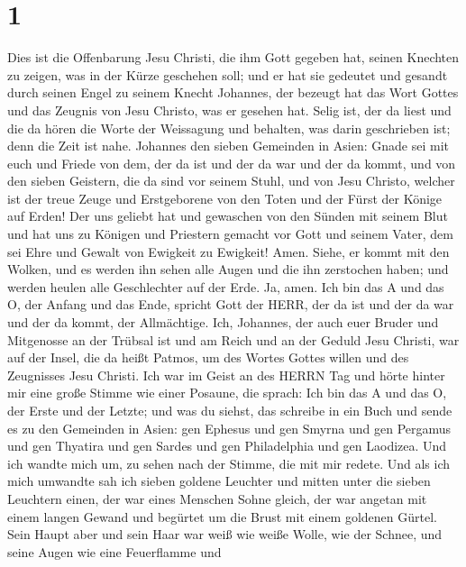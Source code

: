 \hypertarget{section}{%
\section{1}\label{section}}

 Dies ist die Offenbarung Jesu Christi, die ihm Gott gegeben
hat, seinen Knechten zu zeigen, was in der Kürze geschehen soll; und er
hat sie gedeutet und gesandt durch seinen Engel zu seinem Knecht
Johannes,  der bezeugt hat das Wort Gottes und das Zeugnis
von Jesu Christo, was er gesehen hat.  Selig ist, der da
liest und die da hören die Worte der Weissagung und behalten, was darin
geschrieben ist; denn die Zeit ist nahe.  Johannes den
sieben Gemeinden in Asien: Gnade sei mit euch und Friede von dem, der da
ist und der da war und der da kommt, und von den sieben Geistern, die da
sind vor seinem Stuhl,  und von Jesu Christo, welcher ist
der treue Zeuge und Erstgeborene von den Toten und der Fürst der Könige
auf Erden! Der uns geliebt hat und gewaschen von den Sünden mit seinem
Blut  und hat uns zu Königen und Priestern gemacht vor Gott
und seinem Vater, dem sei Ehre und Gewalt von Ewigkeit zu Ewigkeit!
Amen.  Siehe, er kommt mit den Wolken, und es werden ihn
sehen alle Augen und die ihn zerstochen haben; und werden heulen alle
Geschlechter auf der Erde. Ja, amen.  Ich bin das A und das
O, der Anfang und das Ende, spricht Gott der HERR, der da ist und der da
war und der da kommt, der Allmächtige.  Ich, Johannes, der
auch euer Bruder und Mitgenosse an der Trübsal ist und am Reich und an
der Geduld Jesu Christi, war auf der Insel, die da heißt Patmos, um des
Wortes Gottes willen und des Zeugnisses Jesu Christi.  Ich
war im Geist an des HERRN Tag und hörte hinter mir eine große Stimme wie
einer Posaune,  die sprach: Ich bin das A und das O, der
Erste und der Letzte; und was du siehst, das schreibe in ein Buch und
sende es zu den Gemeinden in Asien: gen Ephesus und gen Smyrna und gen
Pergamus und gen Thyatira und gen Sardes und gen Philadelphia und gen
Laodizea.  Und ich wandte mich um, zu sehen nach der
Stimme, die mit mir redete. Und als ich mich umwandte sah ich sieben
goldene Leuchter  und mitten unter die sieben Leuchtern
einen, der war eines Menschen Sohne gleich, der war angetan mit einem
langen Gewand und begürtet um die Brust mit einem goldenen Gürtel.
 Sein Haupt aber und sein Haar war weiß wie weiße Wolle,
wie der Schnee, und seine Augen wie eine Feuerflamme  und
